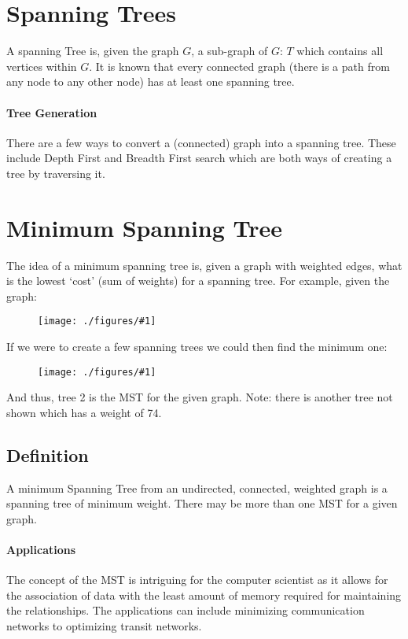 \documentclass[12pt]{book}
\title{\coursetitle\linebreak\lecturename}
\author{\\Cain Susko\\ 
           \\ \\ \\
      Queen's University 
    \\School of Computing\\}
\newcommand{\incimg}[2]{%
       \begin{figure}[h]
               \centering
               \texttt{[image: ./figures/\#1]}
       \end{figure}
}
\begin{document}
\begin{titlepage}
        \maketitle
\end{titlepage}


\section*{Spanning Trees}
A spanning Tree is, given the graph $G$, a sub-graph of $G$: $T$ which
contains all vertices within $G$. It is known that every connected graph 
(there is a path from any node to any other node) has at least one
spanning tree.

\paragraph{Tree Generation}
There are a few ways to convert a (connected) graph into a spanning
tree. These include Depth First and Breadth First search which are both
ways of creating a tree by traversing it.

\section*{Minimum Spanning Tree}
The idea of a minimum spanning tree is, given a graph with weighted edges,
what is the lowest `cost' (sum of weights) for a spanning tree. For example,
given the graph:
\incimg{graph}{1}

If we were to create a few spanning trees we could then find the 
minimum one:
\incimg{MST}{0.7}

And thus, tree 2 is the MST for the given graph. Note: there is another tree
not shown which has a weight of 74.

\subsection*{Definition}
A minimum Spanning Tree from an undirected, connected, weighted graph is
a spanning tree of minimum weight. There may be more than one MST for
a given graph.

\paragraph{Applications}
The concept of the MST is intriguing for the computer scientist as it
allows for the association of data with the least amount of memory 
required for maintaining the relationships. The applications can include
minimizing communication networks to optimizing transit networks.
\end{document}
